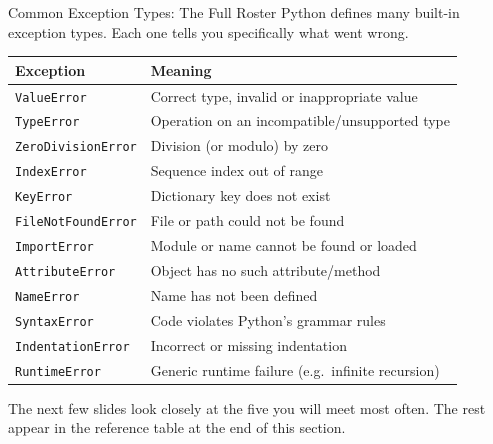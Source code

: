 \documentclass[9pt,aspectratio=169,xcolor=table]{beamer}
\newcommand{\striped}{\rowcolors{1}{white}{stripe}}
\begin{document}
\begin{frame}{Common Exception Types: The Full Roster}
    \leavevmode
    \small
    Python defines many built-in exception types. Each one tells you
    specifically what went wrong.

    \vspace{2mm}
    \striped
    \begin{center}
    \scriptsize
    \begin{tabular}{@{}ll@{}}
    \toprule
    \textbf{Exception} & \textbf{Meaning} \\
    \midrule
    \texttt{ValueError} & Correct type, invalid or inappropriate value \\
    \texttt{TypeError} & Operation on an incompatible/unsupported type \\
    \texttt{ZeroDivisionError} & Division (or modulo) by zero \\
    \texttt{IndexError} & Sequence index out of range \\
    \texttt{KeyError} & Dictionary key does not exist \\
    \texttt{FileNotFoundError} & File or path could not be found \\
    \texttt{ImportError} & Module or name cannot be found or loaded \\
    \texttt{AttributeError} & Object has no such attribute/method \\
    \texttt{NameError} & Name has not been defined \\
    \texttt{SyntaxError} & Code violates Python's grammar rules \\
    \texttt{IndentationError} & Incorrect or missing indentation \\
    \texttt{RuntimeError} & Generic runtime failure (e.g.\ infinite recursion) \\
    \bottomrule
    \end{tabular}
    \end{center}

    \vspace{2mm}
    {\scriptsize The next few slides look closely at the five you will
    meet most often. The rest appear in the reference table at the end
    of this section.}
\end{frame}
\end{document}
